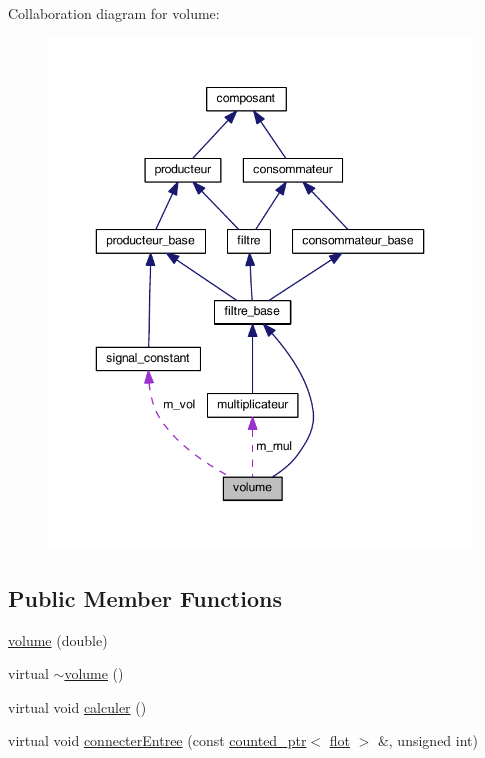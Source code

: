 Collaboration diagram for volume\-:
\nopagebreak
\begin{figure}[H]
\begin{center}
\leavevmode
\includegraphics[width=346pt]{classvolume__coll__graph}
\end{center}
\end{figure}
\subsection*{Public Member Functions}
\begin{DoxyCompactItemize}
\item 
\hyperlink{classvolume_a94d2ba725bfa08519d625e0bee5445d9}{volume} (double)
\item 
virtual \hyperlink{classvolume_ae5872ddf030fb8f9667f3443937cfd2f}{$\sim$volume} ()
\item 
virtual void \hyperlink{classvolume_aab5a1f0490ea8b5826db6edd78e90f1d}{calculer} ()
\item 
virtual void \hyperlink{classvolume_a5ee6dc194dc9d47c9d554a4f94ac0512}{connecter\-Entree} (const \hyperlink{classcounted__ptr}{counted\-\_\-ptr}$<$ \hyperlink{classflot}{flot} $>$ \&, unsigned int)
\end{DoxyCompactItemize}
